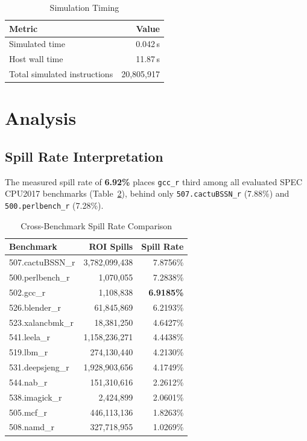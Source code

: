 \documentclass[conference]{IEEEtran}
\begin{document}
\begin{table}[H]
\centering
\caption{Simulation Timing}
\label{tab:timing}
\begin{tabular}{lr}
\toprule
\textbf{Metric} & \textbf{Value} \\
\midrule
Simulated time           & 0.042\,s \\
Host wall time           & 11.87\,s \\
Total simulated instructions & 20,805,917 \\
\bottomrule
\end{tabular}
\end{table}

\section{Analysis}

\subsection{Spill Rate Interpretation}

The measured spill rate of \textbf{6.92\%} places \texttt{gcc\_r}
third among all evaluated SPEC CPU2017 benchmarks
(Table~\ref{tab:compare}), behind only \texttt{507.cactuBSSN\_r}
(7.88\%) and \texttt{500.perlbench\_r} (7.28\%).

\begin{table}[H]
\centering
\caption{Cross-Benchmark Spill Rate Comparison}
\label{tab:compare}
\begin{tabular}{lrr}
\toprule
\textbf{Benchmark} & \textbf{ROI Spills} & \textbf{Spill Rate} \\
\midrule
507.cactuBSSN\_r & 3,782,099,438 & 7.8756\% \\
500.perlbench\_r &     1,070,055 & 7.2838\% \\
502.gcc\_r       &     1,108,838 & \textbf{6.9185\%} \\
526.blender\_r   &    61,845,869 & 6.2193\% \\
523.xalancbmk\_r &    18,381,250 & 4.6427\% \\
541.leela\_r     & 1,158,236,271 & 4.4438\% \\
519.lbm\_r       &   274,130,440 & 4.2130\% \\
531.deepsjeng\_r & 1,928,903,656 & 4.1749\% \\
544.nab\_r       &   151,310,616 & 2.2612\% \\
538.imagick\_r   &     2,424,899 & 2.0601\% \\
505.mcf\_r       &   446,113,136 & 1.8263\% \\
508.namd\_r      &   327,718,955 & 1.0269\% \\
\bottomrule
\end{tabular}
\end{table}
\end{document}
